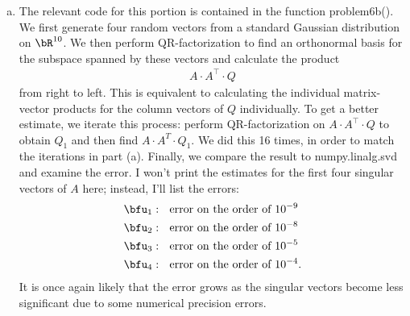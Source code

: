 \begin{homework}[e]
\begin{soln}
\begin{enumerate}[(a)]
      \item The relevant code for this portion is contained in the function problem6b(). We first generate four random vectors from a standard Gaussian distribution on $\bR^{10}$. We then perform QR-factorization to find an orthonormal basis for the subspace spanned by these vectors and calculate the product
        \begin{align*}
          A\cdot A^\top \cdot Q
        \end{align*}
        from right to left. This is equivalent to calculating the individual matrix-vector products for the column vectors of $Q$ individually. To get a better estimate, we iterate this process: perform QR-factorization on $A\cdot A^\top \cdot Q$ to obtain $Q_1$ and then find $A\cdot A^T \cdot Q_1$. We did this 16 times, in order to match the iterations in part (a). Finally, we compare the result to numpy.linalg.svd and examine the error. I won't print the estimates for the first four singular vectors of $A$ here; instead, I'll list the errors:
        \begin{align*}
          \bfu_1&: ~ \text{ error on the order of } 10^{-9} \\
          \bfu_2&: ~ \text{ error on the order of } 10^{-8} \\
          \bfu_3&: ~ \text{ error on the order of } 10^{-5} \\
          \bfu_4&: ~ \text{ error on the order of } 10^{-4}. \\
        \end{align*}
        It is once again likely that the error grows as the singular vectors become less significant due to some numerical precision errors.


\end{enumerate}
\end{soln}
\end{homework}
